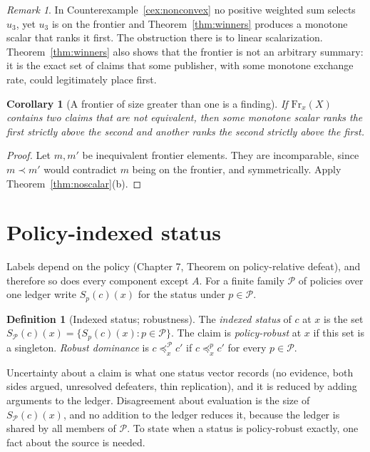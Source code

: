 \documentclass[11pt]{article}
\theoremstyle{plain}
\newtheorem{corollary}[theorem]{Corollary}
\theoremstyle{definition}
\newtheorem{definition}[theorem]{Definition}
\theoremstyle{remark}
\newtheorem{remark}[theorem]{Remark}
\newcommand{\Fr}{\mathrm{Fr}}
\begin{document}
\begin{remark}
In Counterexample~\ref{cex:nonconvex} no positive weighted sum selects $u_3$, yet $u_3$ is on the frontier and Theorem~\ref{thm:winners} produces a monotone scalar that ranks it first. The obstruction there is to linear scalarization. Theorem~\ref{thm:winners} also shows that the frontier is not an arbitrary summary: it is the exact set of claims that some publisher, with some monotone exchange rate, could legitimately place first.
\end{remark}

\begin{corollary}[A frontier of size greater than one is a finding]\label{cor:finding}
If $\Fr_x(X)$ contains two claims that are not equivalent, then some monotone scalar ranks the first strictly above the second and another ranks the second strictly above the first.
\end{corollary}

\begin{proof}
Let $m,m'$ be inequivalent frontier elements. They are incomparable, since $m\prec m'$ would contradict $m$ being on the frontier, and symmetrically. Apply Theorem~\ref{thm:noscalar}(b).
\end{proof}

\section{Policy-indexed status}\label{sec:policy}

Labels depend on the policy (Chapter 7, Theorem on policy-relative defeat), and therefore so does every component except $A$. For a finite family $\mathcal P$ of policies over one ledger write $S_p(c)(x)$ for the status under $p\in\mathcal P$.

\begin{definition}[Indexed status; robustness]\label{def:indexed}
The \emph{indexed status} of $c$ at $x$ is the set $S_{\mathcal P}(c)(x)=\{S_p(c)(x):p\in\mathcal P\}$. The claim is \emph{policy-robust} at $x$ if this set is a singleton. \emph{Robust dominance} is $c\preceq^{\mathcal P}_x c'$ if $c\preceq^p_x c'$ for every $p\in\mathcal P$.
\end{definition}

Uncertainty about a claim is what one status vector records (no evidence, both sides argued, unresolved defeaters, thin replication), and it is reduced by adding arguments to the ledger. Disagreement about evaluation is the size of $S_{\mathcal P}(c)(x)$, and no addition to the ledger reduces it, because the ledger is shared by all members of $\mathcal P$. To state when a status is policy-robust exactly, one fact about the source is needed.
\end{document}
